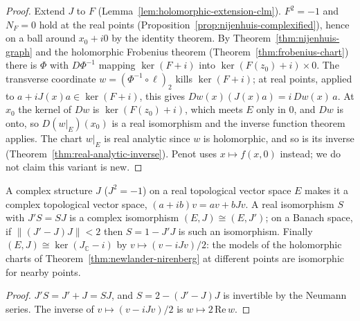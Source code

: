 \begin{proof}
  \leanok
  Extend $J$ to $F$ (Lemma~\ref{lem:holomorphic-extension-clm}). $F^2 = -1$ and $N_F = 0$ hold at
  the real points (Proposition~\ref{prop:nijenhuis-complexified}), hence on a ball around
  $x_0 + i0$ by the identity theorem. By Theorem~\ref{thm:nijenhuis-graph} and the holomorphic
  Frobenius theorem (Theorem~\ref{thm:frobenius-chart}) there is $\Phi$ with $D\Phi^{-1}$ mapping
  $\ker(F + i)$ into $\ker(F(z_0) + i) \times 0$. The transverse coordinate
  $w = (\Phi^{-1} \circ \ell)_2$ kills $\ker(F + i)$; at real points, applied to
  $a + i J(x) a \in \ker(F + i)$, this gives $Dw(x)(J(x) a) = i\,Dw(x)\,a$. At $x_0$ the kernel
  of $Dw$ is $\ker(F(z_0) + i)$, which meets $E$ only in $0$, and $Dw$ is onto, so
  $D(w|_E)(x_0)$ is a real isomorphism and the inverse function theorem applies. The chart
  $w|_E$ is real analytic since $w$ is holomorphic, and so is its inverse
  (Theorem~\ref{thm:real-analytic-inverse}). Penot uses
  $x \mapsto f(x, 0)$ instead; we do not claim this variant is new.
\end{proof}

\begin{theorem}
  \label{thm:complex-structure}
  \leanok
  A complex structure $J$ ($J^2 = -1$) on a real topological vector space $E$ makes it a complex
  topological vector space, $(a + ib)v = av + bJv$. A real isomorphism $S$ with $J'S = SJ$ is a
  complex isomorphism $(E, J) \cong (E, J')$; on a Banach space, if $\|(J' - J)J\| < 2$ then
  $S = 1 - J'J$ is such an isomorphism. Finally $(E, J) \cong \ker(J_{\mathbb{C}} - i)$ by
  $v \mapsto (v - iJv)/2$: the models of the holomorphic charts of
  Theorem~\ref{thm:newlander-nirenberg} at different points are isomorphic for nearby points.
\end{theorem}

\begin{proof}
  \leanok
  $J'S = J' + J = SJ$, and $S = 2 - (J' - J)J$ is invertible by the Neumann series. The inverse of
  $v \mapsto (v - iJv)/2$ is $w \mapsto 2\,\mathrm{Re}\,w$.
\end{proof}
